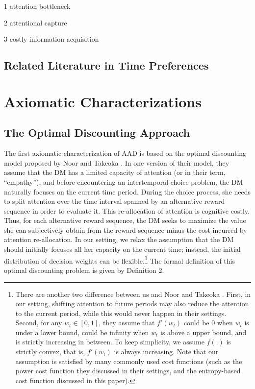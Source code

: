 \documentclass[
  12pt,
]{article}
\begin{document}
1 attention bottleneck

2 attentional capture

3 costly information acquisition

\hypertarget{related-literature-in-time-preferences}{%
\subsection{Related Literature in Time
Preferences}\label{related-literature-in-time-preferences}}

\hypertarget{axiomatic-characterizations}{%
\section{Axiomatic
Characterizations}\label{axiomatic-characterizations}}

\hypertarget{the-optimal-discounting-approach}{%
\subsection{The Optimal Discounting
Approach}\label{the-optimal-discounting-approach}}

The first axiomatic characterization of AAD is based on the optimal
discounting model proposed by Noor and Takeoka
\citetext{\citeyear{noor_optimal_2022}; \citeyear{noor_constrained_2023}}.
In one version of their model, they assume that the DM has a limited
capacity of attention (or in their term, ``empathy''), and before
encountering an intertemporal choice problem, the DM naturally focuses
on the current time period. During the choice process, she needs to
split attention over the time interval spanned by an alternative reward
sequence in order to evaluate it. This re-allocation of attention is
cognitive costly. Thus, for each alternative reward sequence, the DM
seeks to maximize the value she can subjectively obtain from the reward
sequence minus the cost incurred by attention re-allocation. In our
setting, we relax the assumption that the DM should initially focuses
all her capacity on the current time; instead, the initial distribution
of decision weights can be flexible.\footnote{There are another two
  difference between us and Noor and Takeoka
  \citetext{\citeyear{noor_optimal_2022}; \citeyear{noor_constrained_2023}}.
  First, in our setting, shifting attention to future periods may also
  reduce the attention to the current period, while this would never
  happen in their settings. Second, for any \(w_t\in[0,1]\), they assume
  that \(f'(w_t)\) could be 0 when \(w_t\) is under a lower bound, could
  be infinity when \(w_t\) is above a upper bound, and is strictly
  increasing in between. To keep simplicity, we assume \(f(.)\) is
  strictly convex, that is, \(f'(w_t)\) is always increasing. Note that
  our assumption is satisfied by many commonly used cost functions (such
  as the power cost function they discussed in their settings, and the
  entropy-based cost function discussed in this paper).} The formal
definition of this optimal discounting problem is given by Definition 2.
\end{document}
